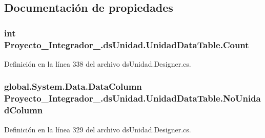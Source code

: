 \subsection{Documentación de propiedades}
\hypertarget{class_proyecto___integrador__3_1_1ds_unidad_1_1_unidad_data_table_aed99128b72fd2e0373199e48490fd8de}{
\subsubsection[{Count}]{\setlength{\rightskip}{0pt plus 5cm}int Proyecto\-\_\-\-Integrador\-\_.\-ds\-Unidad.\-Unidad\-Data\-Table.\-Count\hspace{0.3cm}{\ttfamily [get]}}}\label{class_proyecto___integrador__3_1_1ds_unidad_1_1_unidad_data_table_aed99128b72fd2e0373199e48490fd8de}


Definición en la línea 338 del archivo ds\-Unidad.\-Designer.\-cs.

\hypertarget{class_proyecto___integrador__3_1_1ds_unidad_1_1_unidad_data_table_a60fca63e0242eacb5a1c7aaf65c7f36b}{
\subsubsection[{No\-Unidad\-Column}]{\setlength{\rightskip}{0pt plus 5cm}global.\-System.\-Data.\-Data\-Column Proyecto\-\_\-\-Integrador\-\_.\-ds\-Unidad.\-Unidad\-Data\-Table.\-No\-Unidad\-Column\hspace{0.3cm}{\ttfamily [get]}}}\label{class_proyecto___integrador__3_1_1ds_unidad_1_1_unidad_data_table_a60fca63e0242eacb5a1c7aaf65c7f36b}


Definición en la línea 329 del archivo ds\-Unidad.\-Designer.\-cs.

